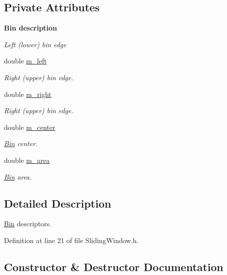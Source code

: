 \subsection*{Private Attributes}
\begin{Indent}{\bf Bin description}\par
{\em Left (lower) bin edge }\begin{DoxyCompactItemize}
\item 
double \hyperlink{classSlidingWindow_1_1Bin_a46a807a48bdf12a4cf8b2ccadb7a5ac7}{m\+\_\+left}
\begin{DoxyCompactList}\small\item\em Right (upper) bin edge. \end{DoxyCompactList}\item 
double \hyperlink{classSlidingWindow_1_1Bin_acda727a7789040fde0f10ac1c0c79bab}{m\+\_\+right}
\begin{DoxyCompactList}\small\item\em Right (upper) bin edge. \end{DoxyCompactList}\item 
double \hyperlink{classSlidingWindow_1_1Bin_a6b5b0a0ef26124b8d6a889af4f4c1b8f}{m\+\_\+center}
\begin{DoxyCompactList}\small\item\em \hyperlink{classSlidingWindow_1_1Bin}{Bin} center. \end{DoxyCompactList}\item 
double \hyperlink{classSlidingWindow_1_1Bin_acf2994cc62ec5cc5e3d364fdd32a8cc8}{m\+\_\+area}
\begin{DoxyCompactList}\small\item\em \hyperlink{classSlidingWindow_1_1Bin}{Bin} area. \end{DoxyCompactList}\end{DoxyCompactItemize}
\end{Indent}


\subsection{Detailed Description}
\hyperlink{classSlidingWindow_1_1Bin}{Bin} descriptors. 

Definition at line 21 of file Sliding\+Window.\+h.



\subsection{Constructor \& Destructor Documentation}
